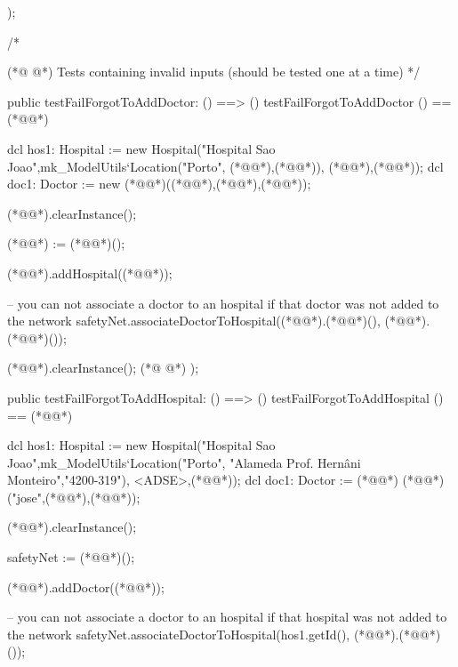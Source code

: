 \begin{vdmpp}[breaklines=true]
);

/*

(*@
\label{testFailForgotToAddDoctor:983}
@*)
 Tests containing invalid inputs (should be tested one at a time)
*/

public testFailForgotToAddDoctor: () ==> ()
 testFailForgotToAddDoctor () == (*@\vdmnotcovered{(}@*)
 
   dcl hos1: Hospital := new Hospital("Hospital Sao Joao",mk_ModelUtils`Location("Porto", (*@@*),(*@@*)), {(*@@*),(*@@*)});
   dcl doc1: Doctor := new (*@@*)((*@@*),(*@@*),(*@@*));
   
   (*@@*).clearInstance();
   
   (*@@*) := (*@@*)();
   
   (*@@*).addHospital((*@@*));
    
   -- you can not associate a doctor to an hospital if that doctor was not added to the network 
   safetyNet.associateDoctorToHospital((*@@*).(*@@*)(), (*@@*).(*@@*)());
   
   (*@@*).clearInstance();
(*@
\label{testFailForgotToAddHospital:1002}
@*)
);
 
 
 public testFailForgotToAddHospital: () ==> ()
  testFailForgotToAddHospital () == (*@\vdmnotcovered{(}@*)
  
    dcl hos1: Hospital := new Hospital("Hospital Sao Joao",mk_ModelUtils`Location("Porto", "Alameda Prof. Hernâni Monteiro","4200-319"), {<ADSE>,(*@@*)});
   dcl doc1: Doctor := (*@@*) (*@@*)("jose",(*@@*),(*@@*));
   
   (*@@*).clearInstance();   
   
   safetyNet := (*@@*)();
   
   (*@@*).addDoctor((*@@*));
    
   -- you can not associate a doctor to an hospital if that hospital was not added to the network 
   safetyNet.associateDoctorToHospital(hos1.getId(), (*@@*).(*@@*)());
   

\end{vdmpp}
